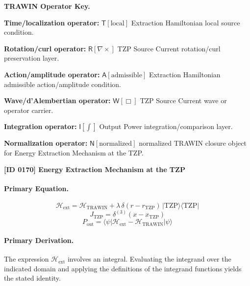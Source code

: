 \par\vspace{0.45\baselineskip}
\noindent\begin{minipage}[t]{\linewidth}
\begingroup
\small
\raggedright
\textbf{TRAWIN Operator Key.}\par
\noindent\textbf{Time/localization operator:} $\mathsf{T}\!\left[\mathrm{local}\right]$ Extraction Hamiltonian local source condition.\par
\noindent\textbf{Rotation/curl operator:} $\mathsf{R}\!\left[\nabla\times\right]$ TZP Source Current rotation/curl preservation layer.\par
\noindent\textbf{Action/amplitude operator:} $\mathsf{A}\!\left[\mathrm{admissible}\right]$ Extraction Hamiltonian admissible action/amplitude condition.\par
\noindent\textbf{Wave/d'Alembertian operator:} $\mathsf{W}\!\left[\Box\right]$ TZP Source Current wave or operator carrier.\par
\noindent\textbf{Integration operator:} $\mathsf{I}\!\left[\int\right]$ Output Power integration/comparison layer.\par
\noindent\textbf{Normalization operator:} $\mathsf{N}\!\left[\mathrm{normalized}\right]$ normalized TRAWIN closure object for Energy Extraction Mechanism at the TZP.\par
\endgroup
\end{minipage}

\clearpage
\noindent\textbf{[ID 0170] Energy Extraction Mechanism at the TZP}\par
\vspace{0.35em}
\paragraph{Primary Equation.}
\[
\mathcal{H}_{\mathrm{ext}}
=
\mathcal{H}_{\mathrm{TRAWIN}}+\lambda\,\delta(r-r_{\mathrm{TZP}})\,\vert \mathrm{TZP}\rangle\langle \mathrm{TZP}\vert
\]
\[
J_{\mathrm{TZP}}=\delta^{(3)}(x-x_{\mathrm{TZP}})
\]
\[
P_{\mathrm{out}}
=
\langle\psi\vert \mathcal{H}_{\mathrm{ext}}-\mathcal{H}_{\mathrm{TRAWIN}}\vert\psi\rangle
\]

\paragraph{Primary Derivation.}
The expression \( \mathcal{H}_{\mathrm{ext}} \) involves an integral. Evaluating the integrand over the indicated domain and applying the definitions of the integrand functions yields the stated identity.
